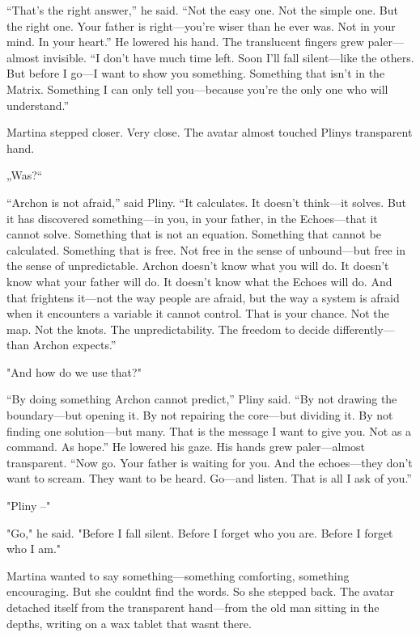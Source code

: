\documentclass[
]{article}
\begin{document}
``That's the right answer,'' he said. ``Not the easy one. Not the simple one. But the right one. Your father is right---you're wiser than he ever was. Not in your mind. In your heart.'' He lowered his hand. The translucent fingers grew paler---almost invisible. ``I don't have much time left. Soon I'll fall silent---like the others. But before I go---I want to show you something. Something that isn't in the Matrix. Something I can only tell you---because you're the only one who will understand.''

Martina stepped closer. Very close. The avatar almost touched Pliny\textquotesingle s transparent hand.

„Was?{\kern0pt}``

``Archon is not afraid,'' said Pliny. ``It calculates. It doesn't think---it solves. But it has discovered something---in you, in your father, in the Echoes---that it cannot solve. Something that is not an equation. Something that cannot be calculated. Something that is free. Not free in the sense of unbound---but free in the sense of unpredictable. Archon doesn't know what you will do. It doesn't know what your father will do. It doesn't know what the Echoes will do. And that frightens it---not the way people are afraid, but the way a system is afraid when it encounters a variable it cannot control. That is your chance. Not the map. Not the knots. The unpredictability. The freedom to decide differently---than Archon expects.''

"And how do we use that?"

``By doing something Archon cannot predict,'' Pliny said. ``By not drawing the boundary---but opening it. By not repairing the core---but dividing it. By not finding one solution---but many. That is the message I want to give you. Not as a command. As hope.'' He lowered his gaze. His hands grew paler---almost transparent. ``Now go. Your father is waiting for you. And the echoes---they don't want to scream. They want to be heard. Go---and listen. That is all I ask of you.''

"Pliny --"

"Go," he said. "Before I fall silent. Before I forget who you are. Before I forget who I am."

Martina wanted to say something---something comforting, something encouraging. But she couldn\textquotesingle t find the words. So she stepped back. The avatar detached itself from the transparent hand---from the old man sitting in the depths, writing on a wax tablet that wasn\textquotesingle t there.
\end{document}
